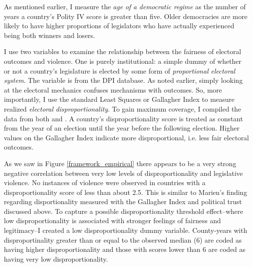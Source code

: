 \documentclass[a4paper]{article}\usepackage{graphicx, color}
\begin{document}
As mentioned earlier, I measure the {\emph{age of a democratic regime}} as the number of years a country's Polity IV score is greater than five. Older democracies are more likely to have higher proportions of legislators who have actually experienced being both winners and losers. 

I use two variables to examine the relationship between the fairness of electoral outcomes and violence. One is purely institutional: a simple dummy of whether or not a country's legislature is elected by some form of {\emph{proportional electoral system}}. The variable is from the DPI database. As noted earlier, simply looking at the electoral mechanics confuses mechanisms with outcomes. So, more importantly, I use the standard Least Squares or Gallagher Index \citep{Gallagher1991} to measure realized {\emph{electoral disproportionality}}. To gain maximum coverage, I compiled the data from both \cite{Gallagher2012} and \cite{Carey2011}. A country's disproportionality score is treated as constant from the year of an election until the year before the following election. Higher values on the Gallagher Index indicate more disproportional, i.e. less fair electoral outcomes. 

As we saw in Figure \ref{framework_empirical} there appears to be a very strong negative correlation between very low levels of disproportionality and legislative violence. No instances of violence were observed in countries with a disproportionality score of less than about 2.5. This is similar to Marien's \citeyearpar{Marien2011} finding regarding disportionality measured with the Gallagher Index and political trust discussed above. To capture a possible disproportionality threshold effect--where low disproportionality is associated with stronger feelings of fairness and legitimacy--I created a low disproportionality dummy variable. County-years with disproportinality greater than or equal to the observed median (6) are coded as having higher disproportionality and those with scores lower than 6 are coded as having very low disproportionality. 
\end{document}
